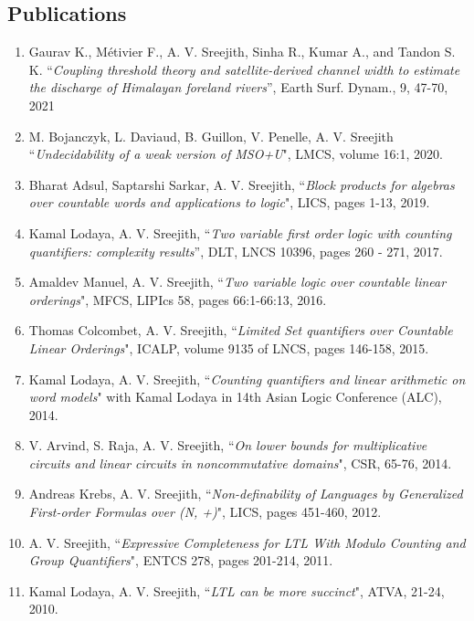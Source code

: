 \documentclass[margin]{res}
\begin{document}
\begin{resume}
\section{Publications}
\begin{enumerate}
\item Gaurav K., Métivier F., A. V. Sreejith, Sinha R., Kumar A., and Tandon S. K. ``\emph{Coupling threshold theory and satellite-derived channel width to estimate the discharge of Himalayan foreland rivers}'', Earth Surf. Dynam., 9, 47-70, 2021
\item M. Bojanczyk, L. Daviaud, B. Guillon, V. Penelle, A. V. Sreejith ``\emph{Undecidability of a weak version of MSO+U}", LMCS, volume 16:1, 2020.
\item Bharat Adsul, Saptarshi Sarkar, A. V. Sreejith, ``\emph{Block products for algebras over countable words and applications to logic}", LICS, pages 1-13, 2019.
\item Kamal Lodaya, A. V. Sreejith, ``\emph{Two variable first order logic with counting quantifiers: complexity results}'', DLT, LNCS 10396, pages 260 - 271, 2017.
\item Amaldev Manuel, A. V. Sreejith, ``\emph{Two variable logic over countable linear orderings}", MFCS, LIPIcs 58, pages 66:1-66:13, 2016. 
\item Thomas Colcombet, A. V. Sreejith, ``\emph{Limited Set quantifiers over Countable Linear Orderings}", ICALP, volume 9135 of LNCS, pages 146-158, 2015. 
\item Kamal Lodaya, A. V. Sreejith, ``\emph{Counting quantifiers and linear arithmetic on word models}" with Kamal Lodaya in 14th Asian Logic Conference (ALC), 2014.
\item V. Arvind, S. Raja, A. V. Sreejith, ``\emph{On lower bounds for multiplicative circuits and linear circuits in noncommutative domains}", CSR, 65-76, 2014.
\item Andreas Krebs, A. V. Sreejith, ``\emph{Non-definability of Languages by Generalized First-order Formulas over (N, +)}", LICS,  pages 451-460, 2012.
\item A. V. Sreejith, ``\emph{Expressive Completeness for LTL With Modulo Counting and Group Quantifiers}", ENTCS 278, pages 201-214, 2011.
\item Kamal Lodaya, A. V. Sreejith, ``\emph{LTL can be more succinct}", ATVA, 21-24, 2010.
\end{enumerate}



\end{resume}
\end{document}
